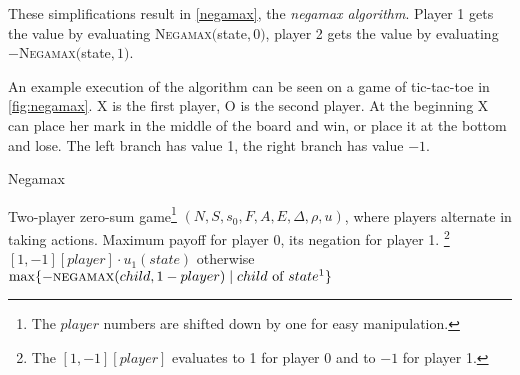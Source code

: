 These simplifications result in \autoref{negamax}, the {\em negamax
algorithm}.
Player 1 gets the value by evaluating
\textsc{Negamax}$($state$, 0)$,
player 2 gets the value by evaluating $-$\textsc{Negamax}$($state$, 1)$.

An example execution of the algorithm can be seen on a game of
tic-tac-toe in \autoref{fig:negamax}.
X is the first player, O is the second player. At the beginning X can
place her mark in the middle of the board and win, or place it at the
bottom and lose. The left branch has value 1, the right branch has value
$-1$.


\begin{algorithm}
\caption{Negamax}
\label{negamax}
\begin{algorithmic}
\Input Two-player zero-sum game\footnote{The $player$
numbers are shifted down by one for easy manipulation.}
$(N, S, s_0, F, A, E, \Delta, \rho, u)$, where players
 alternate in taking actions.
\Output Maximum payoff for player 0, its negation for player 1.
    \State \Return\footnote{The
    $[1,-1][player]$ evaluates to 1 for player 0 and to $-1$ for player 1.}
        $[1,-1][player] \cdot u_1(state)$
        otherwise
    \EndIf
    \State \Return $\max \{ - \Call{negamax}{child, 1 - player}
        \mid
        child \text{ of } state\footnote{Precisely
        for all enabled actions $a \in E(state)$ every $child \in \Delta(state, a)$.}
    \}$
\EndFunction
\end{algorithmic}
\end{algorithm}

